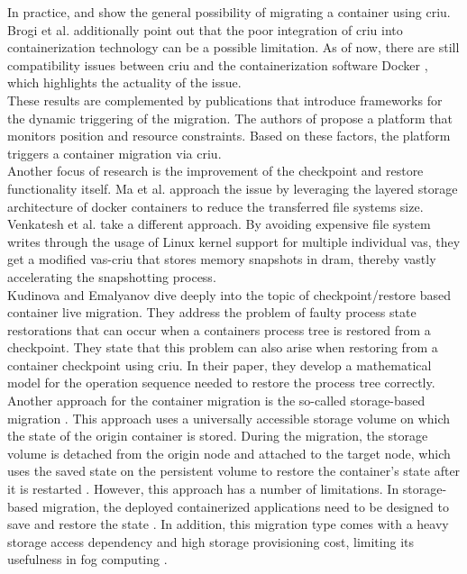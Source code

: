 In practice, \cite{Brogi.2018} and \cite{Oh.2018} show the general possibility of migrating a container using \gls{criu}. Brogi et al. \cite{Brogi.2018} additionally point out that the poor integration of \gls{criu} into containerization technology can be a possible limitation. As of now, there are still compatibility issues between \gls{criu} and the containerization software Docker \cite{.27032020}, which highlights the actuality of the issue.\\
These results are complemented by publications that introduce frameworks for the dynamic triggering of the migration. The authors of \cite{Puliafito.2018} propose a platform that monitors position and resource constraints. Based on these factors, the platform triggers a container migration via \gls{criu}.\\
Another focus of research is the improvement of the checkpoint and restore functionality itself. Ma et al. \cite{Ma.2019} approach the issue by leveraging the layered storage architecture of docker containers to reduce the transferred file systems size. Venkatesh et al. \cite{Venkatesh.2019} take a different approach. By avoiding expensive file system writes through the usage of Linux kernel support for multiple individual \gls{vas}, they get a modified \gls{vas}-\gls{criu} that stores memory snapshots in \gls{dram}, thereby vastly accelerating the snapshotting process.\\
Kudinova and Emalyanov \cite{Kudinova.2017} dive deeply into the topic of checkpoint/restore based container live migration. They address the problem of faulty process state restorations that can occur when a containers process tree is restored from a checkpoint. They state that this problem can also arise when restoring from a container checkpoint using \gls{criu}. In their paper, they develop a mathematical model for the operation sequence needed to restore the process tree correctly.\\
Another approach for the container migration is the so-called storage-based migration \cite{Oh.2018}. This approach uses a universally accessible storage volume on which the state of the origin container is stored. During the migration, the storage volume is detached from the origin node and attached to the target node, which uses the saved state on the persistent volume to restore the container's state after it is restarted \cite{Oh.2018}. However, this approach has a number of limitations. In storage-based migration, the deployed containerized applications need to be designed to save and restore the state \cite{Oh.2018}. In addition, this migration type comes with a heavy storage access dependency and high storage provisioning cost, limiting its usefulness in fog computing \cite{Oh.2018}.


